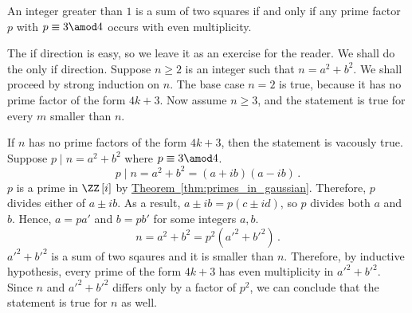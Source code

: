 \documentclass[11pt]{scrartcl}
\begin{document}
\begin{exercise}
An integer greater than \(1\) is a sum of two squares if and only if any prime factor \(p\) with \(p \equiv 3 \amod 4\) occurs with even multiplicity.
\end{exercise}
\begin{soln}
The if direction is easy, so we leave it as an exercise for the reader. We shall do the only if direction. Suppose \(n \ge 2\) is an integer such that \(n=a^2+b^2\). We shall proceed by strong induction on \(n\). The base case \(n=2\) is true, because it has no prime factor of the form \(4k+3\). Now assume \(n \ge 3\), and the statement is true for every \(m\) smaller than \(n\).

If \(n\) has no prime factors of the form \(4k+3\), then the statement is vacously true. Suppose \(p \mid n = a^2+b^2\) where \(p\equiv 3 \amod 4\).
\[ p \mid n = a^2+b^2 = \left(a+ib\right) \left(a-ib\right) \,. \]
\(p\) is a prime in \(\ZZ \left[i\right] \) by \hyperref[thm:primes_in_gaussian]{Theorem~\ref*{thm:primes_in_gaussian}}. Therefore, \(p\) divides either of \(a \pm ib\). As a result, \(a \pm ib = p \left(c\pm id\right) \), so \(p\) divides
both \(a\) and \(b\). Hence, \(a=pa'\) and \(b=pb'\) for some integers \(a,b\).
\[ n= a^2+b^2 = p^2 \left(a'^2 + b'^2\right) \,. \]
\(a'^2 + b'^2\) is a sum of two sqaures and it is smaller than \(n\). Therefore, by inductive hypothesis, every prime of the form \(4k+3\) has even multiplicity in \(a'^2 + b'^2\). Since \(n\) and \(a'^2 + b'^2\) differs only by a factor of \(p^2\), we can conclude that the statement is true for \(n\) as well.
\end{soln}
\end{document}
